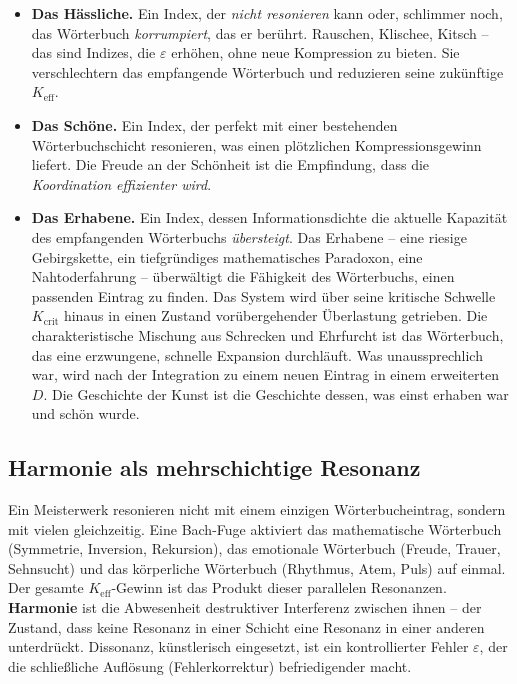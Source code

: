 \documentclass[12pt,a4paper]{article}
\begin{document}
\begin{itemize}[leftmargin=*]
	\item \textbf{Das Hässliche.} Ein Index, der \emph{nicht resonieren} kann oder, schlimmer noch, das Wörterbuch \emph{korrumpiert}, das er berührt. Rauschen, Klischee, Kitsch – das sind Indizes, die \(\varepsilon\) erhöhen, ohne neue Kompression zu bieten. Sie verschlechtern das empfangende Wörterbuch und reduzieren seine zukünftige \(K_{\mathrm{eff}}\).
	\item \textbf{Das Schöne.} Ein Index, der perfekt mit einer bestehenden Wörterbuchschicht resonieren, was einen plötzlichen Kompressionsgewinn liefert. Die Freude an der Schönheit ist die Empfindung, dass die \emph{Koordination effizienter wird}.
	\item \textbf{Das Erhabene.} Ein Index, dessen Informationsdichte die aktuelle Kapazität des empfangenden Wörterbuchs \emph{übersteigt}. Das Erhabene – eine riesige Gebirgskette, ein tiefgründiges mathematisches Paradoxon, eine Nahtoderfahrung – überwältigt die Fähigkeit des Wörterbuchs, einen passenden Eintrag zu finden. Das System wird über seine kritische Schwelle \(K_{\mathrm{crit}}\) hinaus in einen Zustand vorübergehender Überlastung getrieben. Die charakteristische Mischung aus Schrecken und Ehrfurcht ist das Wörterbuch, das eine erzwungene, schnelle Expansion durchläuft. Was unaussprechlich war, wird nach der Integration zu einem neuen Eintrag in einem erweiterten \(D\). Die Geschichte der Kunst ist die Geschichte dessen, was einst erhaben war und schön wurde.
\end{itemize}

\subsection{Harmonie als mehrschichtige Resonanz}

Ein Meisterwerk resonieren nicht mit einem einzigen Wörterbucheintrag, sondern mit vielen gleichzeitig. Eine Bach-Fuge aktiviert das mathematische Wörterbuch (Symmetrie, Inversion, Rekursion), das emotionale Wörterbuch (Freude, Trauer, Sehnsucht) und das körperliche Wörterbuch (Rhythmus, Atem, Puls) auf einmal. Der gesamte \(K_{\mathrm{eff}}\)-Gewinn ist das Produkt dieser parallelen Resonanzen. \textbf{Harmonie} ist die Abwesenheit destruktiver Interferenz zwischen ihnen – der Zustand, dass keine Resonanz in einer Schicht eine Resonanz in einer anderen unterdrückt. Dissonanz, künstlerisch eingesetzt, ist ein kontrollierter Fehler \(\varepsilon\), der die schließliche Auflösung (Fehlerkorrektur) befriedigender macht.
\end{document}
